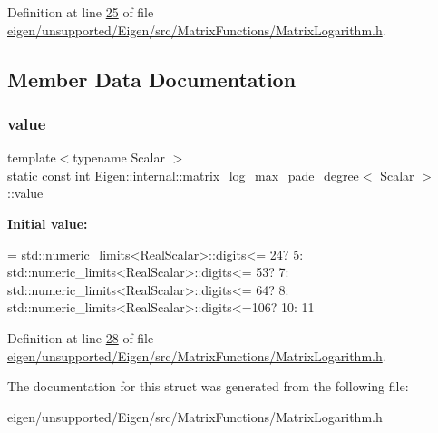 Definition at line \hyperlink{eigen_2unsupported_2_eigen_2src_2_matrix_functions_2_matrix_logarithm_8h_source_l00025}{25} of file \hyperlink{eigen_2unsupported_2_eigen_2src_2_matrix_functions_2_matrix_logarithm_8h_source}{eigen/unsupported/\+Eigen/src/\+Matrix\+Functions/\+Matrix\+Logarithm.\+h}.



\subsection{Member Data Documentation}
\mbox{\label{struct_eigen_1_1internal_1_1matrix__log__max__pade__degree_a24589a37482ceaf9a8b27480e2466b82}} 
\subsubsection{\texorpdfstring{value}{value}}
{\footnotesize\ttfamily template$<$typename Scalar $>$ \\
static const int \hyperlink{struct_eigen_1_1internal_1_1matrix__log__max__pade__degree}{Eigen\+::internal\+::matrix\+\_\+log\+\_\+max\+\_\+pade\+\_\+degree}$<$ Scalar $>$\+::value\hspace{0.3cm}{\ttfamily [static]}}

{\bfseries Initial value\+:}
\begin{DoxyCode}
= std::numeric\_limits<RealScalar>::digits<= 24?  5:  
                           std::numeric\_limits<RealScalar>::digits<= 53?  7:  
                           std::numeric\_limits<RealScalar>::digits<= 64?  8:  
                           std::numeric\_limits<RealScalar>::digits<=106? 10:  
                                                                         11
\end{DoxyCode}


Definition at line \hyperlink{eigen_2unsupported_2_eigen_2src_2_matrix_functions_2_matrix_logarithm_8h_source_l00028}{28} of file \hyperlink{eigen_2unsupported_2_eigen_2src_2_matrix_functions_2_matrix_logarithm_8h_source}{eigen/unsupported/\+Eigen/src/\+Matrix\+Functions/\+Matrix\+Logarithm.\+h}.



The documentation for this struct was generated from the following file\+:\begin{DoxyCompactItemize}
\item 
eigen/unsupported/\+Eigen/src/\+Matrix\+Functions/\+Matrix\+Logarithm.\+h\end{DoxyCompactItemize}
